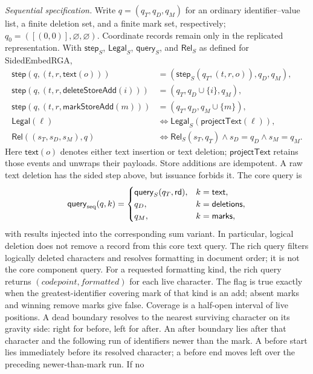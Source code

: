\documentclass[11pt]{article}
\theoremstyle{definition}
\begin{document}
\emph{Sequential specification.} Write $q=(q_T,q_D,q_M)$ for an ordinary
identifier--value list, a finite deletion set, and a finite mark set,
respectively; $q_0=([(0,0)],\varnothing,\varnothing)$.
Coordinate records remain only in the replicated representation. With
$\mathsf{step}_S$, $\mathsf{Legal}_S$, $\mathsf{query}_S$, and
$\mathsf{Rel}_S$ as defined for SidedEmbedRGA,
\[
\begin{aligned}
 \mathsf{step}(q,(t,r,\mathsf{text}(o)))
   &=(\mathsf{step}_S(q_T,(t,r,o)),q_D,q_M),\\
 \mathsf{step}(q,(t,r,\mathsf{deleteStoreAdd}(i)))
   &=(q_T,q_D\cup\{i\},q_M),\\
 \mathsf{step}(q,(t,r,\mathsf{markStoreAdd}(m)))
   &=(q_T,q_D,q_M\cup\{m\}),\\
 \mathsf{Legal}(\ell)&\Longleftrightarrow
   \mathsf{Legal}_S(\mathsf{projectText}(\ell)),\\
 \mathsf{Rel}((s_T,s_D,s_M),q)&\Longleftrightarrow
   \mathsf{Rel}_S(s_T,q_T)\land s_D=q_D\land s_M=q_M.
\end{aligned}
\]
Here $\mathsf{text}(o)$ denotes either text insertion or text deletion;
$\mathsf{projectText}$ retains those events and unwraps their payloads.
Store additions are idempotent. A raw text deletion has the sided step
above, but issuance forbids it. The core query is
\[
 \mathsf{query}_{\rm seq}(q,k)=\begin{cases}
 \mathsf{query}_S(q_T,\mathsf{rd}),&k=\mathsf{text},\\
 q_D,&k=\mathsf{deletions},\\ q_M,&k=\mathsf{marks},
 \end{cases}
\]
with results injected into the corresponding sum variant.
In particular, logical deletion does not
remove a record from this core text query. The rich query filters logically
deleted characters and resolves formatting in document order; it is not the
core component query.
For a requested formatting kind, the rich query returns
$(\mathit{codepoint},\mathit{formatted})$ for each live character. The flag is
true exactly when the greatest-identifier covering mark of that kind is an
add; absent marks and winning remove marks give false. Coverage is a half-open
interval of live positions. A dead boundary resolves to the nearest surviving
character on its gravity side: right for before, left for after. An after
boundary lies after that character and the following run of identifiers newer
than the mark. A before start lies immediately before its resolved character;
a before end moves left over the preceding newer-than-mark run. If no
\end{document}
